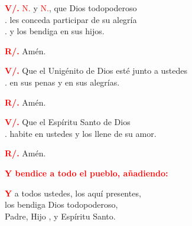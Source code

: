 \documentclass[12pt, letterpaper, spanish]{report}
\begin{document}
\Large \hspace{-0.9cm} {\bfseries \textcolor{red}{V/.}} \hspace{0.5cm} \textcolor{red}{N.} y \textcolor{red}{N.}, que Dios todopoderoso\\
.\hspace{1.5cm} les conceda participar de su alegr\'ia\\
.\hspace{1.5cm} y los bendiga en sus hijos.\newline

\Large \hspace{-0.9cm} {\bfseries \textcolor{red}{R/.}} \hspace{0.5cm} Am\'en.\newline

\Large \hspace{-0.9cm} {\bfseries \textcolor{red}{V/.}} \hspace{0.5cm} Que el Unig\'enito de Dios est\'e junto a ustedes\\
.\hspace{1.5cm} en sus penas y en sus alegr\'ias.\newline

\Large \hspace{-0.9cm} {\bfseries \textcolor{red}{R/.}} \hspace{0.5cm} Am\'en.\newline

\Large \hspace{-0.9cm} {\bfseries \textcolor{red}{V/.}} \hspace{0.5cm} Que el Esp\'iritu Santo de Dios\\
.\hspace{1.5cm} habite en ustedes y los llene de su amor.\newline

\Large \hspace{-0.9cm} {\bfseries \textcolor{red}{R/.}} \hspace{0.5cm} Am\'en.\newline

\large{\bfseries \textcolor{red}{Y bendice a todo el pueblo, a\~nadiendo:}}\newline

\Large \lettrine{\bfseries \textcolor{red}{Y}}{} a todos ustedes, los aqu\'i presentes,\\
los bendiga Dios todopoderoso,\\
Padre, Hijo \Huge{\textcolor{red}{}} \Large, y Esp\'iritu Santo.\newline
\end{document}
